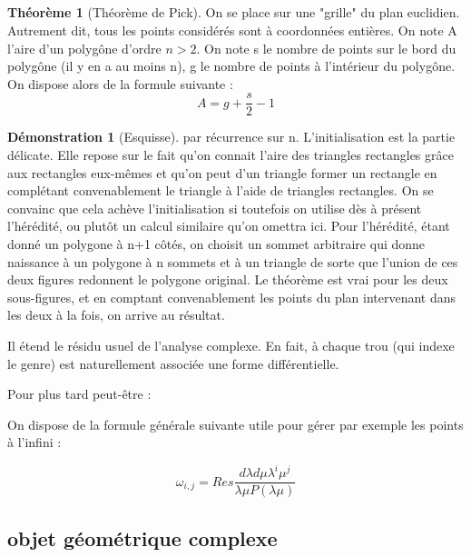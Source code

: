 \documentclass{article}
\theoremstyle{definition} %
\newtheorem{thm}{Théorème}
\newtheorem{dem}{Démonstration}
\newcommand{\1}{\mathbb{1}} %
\begin{document}
\subsection{}

\begin{thm}[Théorème de Pick]
On se place sur une "grille" du plan euclidien.
Autrement dit, tous les points considérés sont à coordonnées entières.
On note A l'aire d'un polygône d'ordre $n>2$.
On note s le nombre de points sur le bord du polygône (il y en a au moins n), g le nombre de points à l'intérieur du polygône.
On dispose alors de la formule suivante :
$$A=g+\frac{s}{2}-1$$
\end{thm}

\begin{dem}[Esquisse]
par récurrence sur n.
L'initialisation est la partie délicate. Elle repose sur le fait qu'on connait l'aire des triangles rectangles grâce aux rectangles eux-mêmes et qu'on peut d'un triangle former un rectangle en complétant convenablement le triangle à l'aide de triangles rectangles. On se convainc que cela achève l'initialisation si toutefois on utilise dès à présent l'hérédité, ou plutôt un calcul similaire qu'on omettra ici.
Pour l'hérédité, étant donné un polygone à n+1 côtés, on choisit un sommet arbitraire qui donne naissance à un polygone à n sommets et à un triangle de sorte que l'union de ces deux figures redonnent le polygone original. Le théorème est vrai pour les deux sous-figures, et en comptant convenablement les points du plan intervenant dans les deux à la fois, on arrive au résultat.
\end{dem}


\begin{tcolorbox}[colback=blue!5!white,colframe=blue!75!black,title=Résidu de Poincaré]
    Il étend le résidu usuel de l'analyse complexe. En fait, à chaque trou (qui indexe le genre) est naturellement associée une forme différentielle.
\end{tcolorbox}

Pour plus tard peut-être :

On dispose de la formule générale suivante utile pour gérer par exemple les points à l'infini :

$$\omega_{i,j}= Res \frac{d\lambda d\mu \lambda^i \mu^j}{\lambda \mu P(\lambda \mu)}$$


\subsection{objet géométrique complexe}
\end{document}
